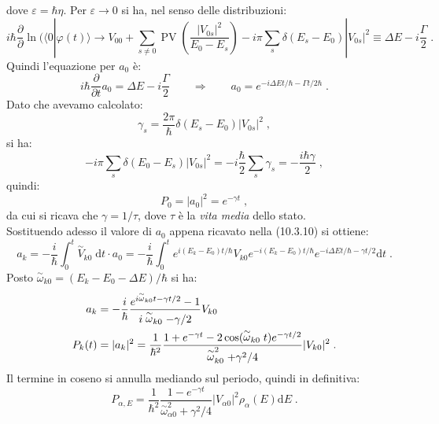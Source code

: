 \documentclass[12pt,a4paper]{report}
\theoremstyle{definition}
\numberwithin{equation}{section}
\newcommand{\diff}[1][]{\mathrm{d}#1}
\newcommand{\bra}{\langle}
\newcommand{\ket}{\rangle}
\begin{document}
dove $\varepsilon=\hbar\eta$. Per $\varepsilon\to 0$ si ha, nel senso delle distribuzioni:
\begin{equation}
i\hbar\frac{\partial}{\partial}\ln(\bra 0|\varphi(t)\ket\to V_{00}+\sum_{s\ne 0}\operatorname{PV}\left(\frac{|V_{0s}|^2}{E_0-E_s}\right)-i\pi\sum_s \delta(E_s-E_0)|V_{0s}|^2\equiv \Delta E-i\frac{\Gamma}{2}\;.
\end{equation}
Quindi l'equazione per $a_0$ è:
\begin{equation}
i\hbar\frac{\partial}{\partial t}a_0=\Delta E -i\frac{\Gamma}{2}\qquad \Longrightarrow \qquad a_0=e^{-i\Delta Et/\hbar-\Gamma t/2\hbar}\;.
\end{equation}
Dato che avevamo calcolato:
\begin{equation*}
\gamma_s=\frac{2\pi}{\hbar}\delta(E_s-E_0)|V_{0s}|^2\;,
\end{equation*}
si ha:
\begin{equation}
-i\pi\sum_s\delta(E_0-E_s)|V_{0s}|^2=-i\frac{\hbar}{2}\sum_s\gamma_s=-\frac{i\hbar \gamma}{2}\;,
\end{equation}
quindi:
\begin{equation}
P_0=|a_0|^2=e^{-\gamma t}\;,
\end{equation}
da cui si ricava che $\gamma=1/\tau$, dove $\tau$ è la \textit{vita media} dello stato.\\
Sostituendo adesso il valore di $a_0$ appena ricavato nella (10.3.10) si ottiene:
\begin{equation}
a_k=-\frac{i}{\hbar}\int_0^t\stackrel{\sim}{V}_{k0}\;\diff{t}\cdot a_0=-\frac{i}{\hbar}\int_0^t e^{i(E_k-E_0)t/\hbar} V_{k0} e^{-i(E_k-E_0)t/\hbar} e^{-i\Delta Et/\hbar-\gamma t/2}\diff{t}\;.
\end{equation}
Posto $\stackrel{\sim}{\omega}_{k0}=(E_k-E_0-\Delta E)/\hbar$ si ha:
\begin{align}
a_k &= -\frac{i}{\hbar}\frac{e^{i\stackrel{\sim}{\omega}_{k0}t-\gamma t/2}-1}{i\stackrel{\sim}{\omega}_{k0}-\gamma/2}V_{k0} \notag \\
P_k(t)&= |a_k|^2=\frac{1}{\hbar^2}\frac{1+e^{-\gamma t}-2\cos(\stackrel{\sim}{\omega}_{k0}t)e^{-\gamma t/2}}{\stackrel{\sim}{\omega}_{k0}^2+\gamma^2/4}|V_{k0}|^2\;.
\end{align}
Il termine in coseno si annulla mediando sul periodo, quindi in definitiva:
\begin{equation}
P_{\alpha,E}=\frac{1}{\hbar^2}\frac{1-e^{-\gamma t}}{\stackrel{\sim}{\omega}_{\alpha 0}^2+\gamma^2/4}|V_{\alpha 0}|^2\rho_{\alpha}(E)\diff{E}\;.
\end{equation}
\end{document}
